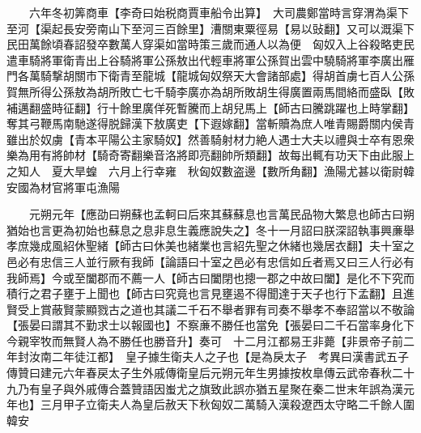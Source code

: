 　　六年冬初筭商車【李奇曰始税商賈車船令出算】　大司農鄭當時言穿渭為渠下至河【渠起長安旁南山下至河三百餘里】漕關東粟徑易【易以䜴翻】又可以溉渠下民田萬餘頃春詔發卒數萬人穿渠如當時策三歲而通人以為便　匈奴入上谷殺略吏民遣車騎將軍衛青出上谷騎將軍公孫敖出代輕車將軍公孫賀出雲中驍騎將軍李廣出雁門各萬騎撃胡關市下衛青至龍城【龍城匈奴祭天大會諸部處】得胡首虜七百人公孫賀無所得公孫敖為胡所敗亡七千騎李廣亦為胡所敗胡生得廣置兩馬間絡而盛臥【敗補邁翻盛時征翻】行十餘里廣佯死暫騰而上胡兒馬上【師古曰騰跳躍也上時掌翻】奪其弓鞭馬南馳遂得脱歸漢下敖廣吏【下遐嫁翻】當斬贖為庶人唯青賜爵關内侯青雖出於奴虜【青本平陽公主家騎奴】然善騎射材力絶人遇士大夫以禮與士卒有恩衆樂為用有將帥材【騎奇寄翻樂音洛將即亮翻帥所類翻】故每出輒有功天下由此服上之知人　夏大旱蝗　六月上行幸雍　秋匈奴數盗邊【數所角翻】漁陽尤甚以衛尉韓安國為材官將軍屯漁陽

　　元朔元年【應劭曰朔蘇也孟軻曰后來其蘇蘇息也言萬民品物大繁息也師古曰朔猶始也言更為初始也蘇息之息非息生義應說失之】冬十一月詔曰朕深詔執事興亷舉孝庶幾成風紹休聖緒【師古曰休美也緒業也言紹先聖之休緒也幾居衣翻】夫十室之邑必有忠信三人並行厥有我師【論語曰十室之邑必有忠信如丘者焉又曰三人行必有我師焉】今或至闔郡而不薦一人【師古曰闔閉也摠一郡之中故曰闔】是化不下究而積行之君子壅于上聞也【師古曰究竟也言見壅遏不得聞達于天子也行下孟翻】且進賢受上賞蔽賢蒙顯戮古之道也其議二千石不舉者罪有司奏不舉孝不奉詔當以不敬論【張晏曰謂其不勤求士以報國也】不察亷不勝任也當免【張晏曰二千石當率身化下今親宰牧而無賢人為不勝任也勝音升】奏可　十二月江都易王非薨【非景帝子前二年封汝南二年徒江都】　皇子據生衛夫人之子也【是為戾太子　考異曰漢書武五子傳贊曰建元六年春戻太子生外戚傳衛皇后元朔元年生男據按枚臯傳云武帝春秋二十九乃有皇子與外戚傳合蓋贊語因蚩尤之旗致此誤亦猶五星聚在秦二世末年誤為漢元年也】三月甲子立衛夫人為皇后赦天下秋匈奴二萬騎入漢殺遼西太守略二千餘人圍韓安

